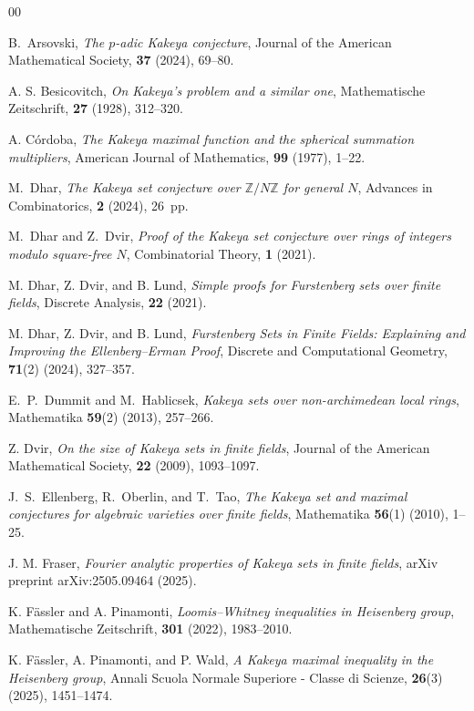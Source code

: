 \documentclass[11pt]{article}
\newcommand{\1}{\mathbf 1}
\begin{document}
\begin{thebibliography}{00}

B.~Arsovski, \textit{The $p$-adic Kakeya conjecture},
Journal of the American Mathematical Society, \textbf{37} (2024), 69--80.

A. S. Besicovitch, \textit{On Kakeya's problem and a similar one}, Mathematische Zeitschrift,
\textbf{27} (1928), 312--320.

A. C\'ordoba, \textit{The Kakeya maximal function and the spherical summation multipliers},
American Journal of Mathematics, \textbf{99} (1977), 1--22.

M.~Dhar,
\textit{The Kakeya set conjecture over $\mathbb{Z}/N\mathbb{Z}$ for general $N$},
Advances in Combinatorics, \textbf{2} (2024), 26~pp.

M.~Dhar and Z.~Dvir,
\textit{Proof of the Kakeya set conjecture over rings of integers modulo square-free $N$}, Combinatorial Theory, \textbf{1} (2021).


M. Dhar, Z. Dvir, and B. Lund, \textit{Simple proofs for Furstenberg sets over finite fields}, Discrete Analysis, \textbf{22} (2021).

M. Dhar, Z. Dvir, and B. Lund, \textit{Furstenberg Sets in Finite Fields: Explaining and Improving the Ellenberg–Erman Proof}, Discrete and Computational Geometry, \textbf{71}(2) (2024), 327--357.

E.~P.~Dummit and M.~Hablicsek,
\textit{Kakeya sets over non-archimedean local rings}, Mathematika \textbf{59}(2) (2013), 257--266.


Z. Dvir, \textit{On the size of Kakeya sets in finite fields}, Journal of the American Mathematical Society, \textbf{22} (2009), 1093--1097.

J.~S.~Ellenberg, R.~Oberlin, and T.~Tao,
\textit{The Kakeya set and maximal conjectures for algebraic varieties over finite fields}, Mathematika \textbf{56}(1) (2010), 1--25.

J. M. Fraser, \textit{Fourier analytic properties of Kakeya sets in finite fields}, 
arXiv preprint arXiv:2505.09464 (2025).

K. F\"{a}ssler and A. Pinamonti, \textit{Loomis--Whitney inequalities in Heisenberg group}, Mathematische Zeitschrift, \textbf{301} (2022), 1983--2010.

K. F\"{a}ssler, A. Pinamonti, and P. Wald, \textit{A Kakeya maximal inequality in the Heisenberg group}, Annali Scuola Normale Superiore - Classe di Scienze, 
\textbf{26}(3) (2025), 1451--1474. 


\end{thebibliography}
\end{document}
